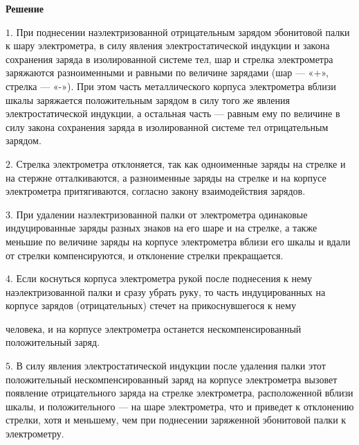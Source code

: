 \documentclass[12pt,a4paper]{article}
\begin{document}
{\begin{center}\end{center}
\par
}{
\smallskip\noindent\textbf{Решение}\par
$1$. При поднесении наэлектризованной отрицательным зарядом эбонитовой палки к шару электрометра, в силу явления электростатической индукции и закона сохранения заряда в изолированной системе тел, шар и стрелка электрометра заряжаются разноименными и равными по величине зарядами (шар — «+», стрелка — «-»). При этом часть металлического корпуса электрометра вблизи шкалы заряжается положительным зарядом в силу того же явления электростатической индукции, а остальная часть — равным ему по величине в силу закона сохранения заряда в изолированной системе тел отрицательным зарядом.\par
$2$. Стрелка электрометра отклоняется, так как одноименные заряды на стрелке и на стержне отталкиваются, а разноименные заряды на стрелке и на корпусе электрометра притягиваются, согласно закону взаимодействия зарядов.\par
$3$. При удалении наэлектризованной палки от электрометра одинаковые индуцированные заряды разных знаков на его шаре и на стрелке, а также меньшие по величине заряды на корпусе электрометра вблизи его шкалы и вдали от стрелки компенсируются, и отклонение стрелки прекращается.\par
$4$. Если коснуться корпуса электрометра рукой после поднесения к нему наэлектризованной палки и сразу убрать руку, то часть индуцированных на корпусе зарядов (отрицательных) стечет на прикоснувшегося к нему\par
человека, и на корпусе электрометра останется нескомпенсированный положительный заряд.\par
$5$. В силу явления электростатической индукции после удаления палки этот положительный нескомпенсированный заряд на корпусе электрометра вызовет появление отрицательного заряда на стрелке электрометра, расположенной вблизи шкалы, и положительного — на шаре электрометра, что и приведет к отклонению стрелки, хотя и меньшему, чем при поднесении заряженной эбонитовой палки к электрометру.\par
}
\end{document}
